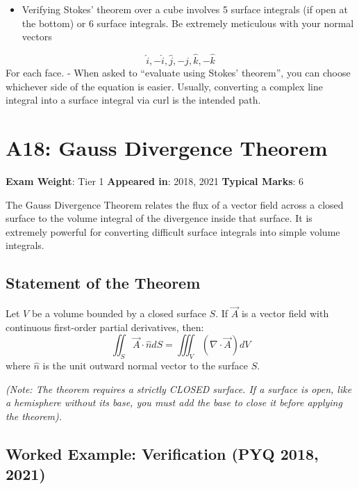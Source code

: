 \documentclass[
]{article}
\providecommand{\tightlist}{%
  \setlength{\itemsep}{0pt}\setlength{\parskip}{0pt}}
\renewenvironment{quote}
  {\begin{tcolorbox}[
     colback=calloutbg,
     colframe=calloutframe,
     colupper=callouttext,
     arc=3pt,
     boxrule=0.5pt,
     leftrule=0.5pt,
     borderline west={3pt}{0pt}{calloutaccent},
     left=8pt,
     right=8pt,
     top=6pt,
     bottom=6pt
   ]}
  {\end{tcolorbox}}
\begin{document}
\begin{itemize}
\tightlist
\item
  Verifying Stokes' theorem over a cube involves 5 surface integrals (if
  open at the bottom) or 6 surface integrals. Be extremely meticulous
  with your normal vectors
\end{itemize}
\[
\hat{i}, -\hat{i}, \hat{j}, -\hat{j}, \hat{k}, -\hat{k}
\]
For each face. - When asked to ``evaluate using Stokes' theorem'', you
can choose whichever side of the equation is easier. Usually, converting
a complex line integral into a surface integral via curl is the intended
path.

\section{A18: Gauss Divergence
Theorem}\label{a18-gauss-divergence-theorem}

\begin{quote}
\textbf{Exam Weight}: Tier 1 \textbar{} \textbf{Appeared in}: 2018, 2021
\textbar{} \textbf{Typical Marks}: 6
\end{quote}

The Gauss Divergence Theorem relates the flux of a vector field across a
closed surface to the volume integral of the divergence inside that
surface. It is extremely powerful for converting difficult surface
integrals into simple volume integrals.

\subsection{Statement of the Theorem}\label{statement-of-the-theorem-2}

Let \(V\) be a volume bounded by a closed surface \(S\). If \(\vec{A}\)
is a vector field with continuous first-order partial derivatives, then:
\[
\iint_S \vec{A} \cdot \hat{n} dS = \iiint_V (\nabla \cdot \vec{A}) dV
\]
where \(\hat{n}\) is the unit outward normal vector to the surface
\(S\).

\emph{(Note: The theorem requires a strictly CLOSED surface. If a
surface is open, like a hemisphere without its base, you must add the
base to close it before applying the theorem).}

\subsection{Worked Example: Verification (PYQ 2018,
2021)}\label{worked-example-verification-pyq-2018-2021}
\end{document}
